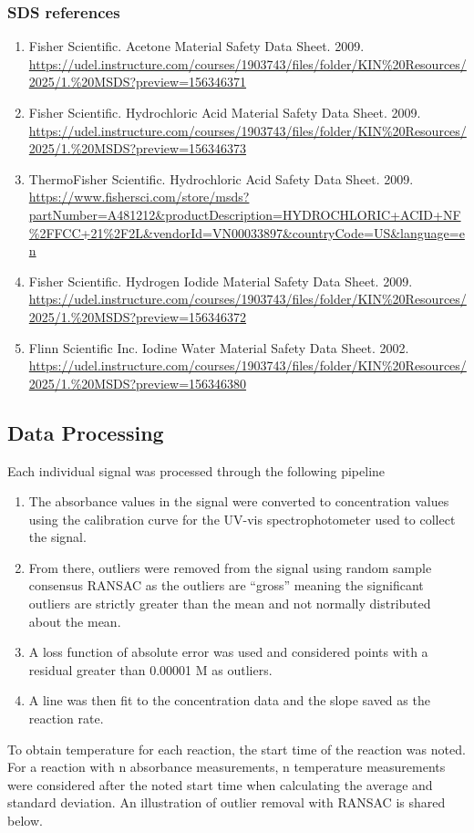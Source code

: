 \subsubsection*{SDS references}
\begin{enumerate}
    \item Fisher Scientific. Acetone Material Safety Data Sheet. 2009. \url{https://udel.instructure.com/courses/1903743/files/folder/KIN%20Resources/2025/1.%20MSDS?preview=156346371}

    \item Fisher Scientific. Hydrochloric Acid Material Safety Data Sheet. 2009. \url{https://udel.instructure.com/courses/1903743/files/folder/KIN%20Resources/2025/1.%20MSDS?preview=156346373}

    \item ThermoFisher Scientific. Hydrochloric Acid Safety Data Sheet. 2009. \url{https://www.fishersci.com/store/msds?partNumber=A481212&productDescription=HYDROCHLORIC+ACID+NF%2FFCC+21%2F2L&vendorId=VN00033897&countryCode=US&language=en}

    \item Fisher Scientific. Hydrogen Iodide Material Safety Data Sheet. 2009. \url{https://udel.instructure.com/courses/1903743/files/folder/KIN%20Resources/2025/1.%20MSDS?preview=156346372}

    \item Flinn Scientific Inc. Iodine Water Material Safety Data Sheet. 2002. \url{https://udel.instructure.com/courses/1903743/files/folder/KIN%20Resources/2025/1.%20MSDS?preview=156346380}
\end{enumerate}



\subsection{Data Processing}
\label{app:processing}

Each individual signal was processed through the following pipeline
\begin{enumerate}
    \item The absorbance values in the signal were converted to concentration values using the calibration curve for the UV-vis spectrophotometer used to collect the signal.
    \item From there, outliers were removed from the signal using random sample consensus RANSAC \autocite{RANSAC} as the outliers are “gross” meaning the significant outliers are strictly greater than the mean and not normally distributed about the mean.
    \item A loss function of absolute error was used and considered points with a residual greater than 0.00001 M as outliers.
    \item A line was then fit to the concentration data and the slope saved as the reaction rate. 
\end{enumerate}
To obtain temperature for each reaction, the start time of the reaction was noted. For a reaction with n absorbance measurements, n temperature measurements were considered after the noted start time when calculating the average and standard deviation. An illustration of outlier removal with RANSAC is shared below.

